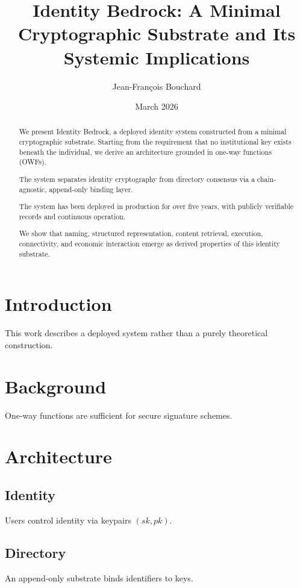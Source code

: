 \documentclass[11pt,a4paper]{article}
\title{\textbf{Identity Bedrock: A Minimal Cryptographic Substrate and Its Systemic Implications}}
\author{Jean-François Bouchard}
\date{March 2026}
\begin{document}
\maketitle

\begin{abstract}
We present Identity Bedrock, a deployed identity system constructed from a minimal cryptographic substrate. Starting from the requirement that no institutional key exists beneath the individual, we derive an architecture grounded in one-way functions (OWFs).

The system separates identity cryptography from directory consensus via a chain-agnostic, append-only binding layer.

The system has been deployed in production for over five years, with publicly verifiable records and continuous operation.

We show that naming, structured representation, content retrieval, execution, connectivity, and economic interaction emerge as derived properties of this identity substrate.
\end{abstract}

\section{Introduction}

This work describes a deployed system rather than a purely theoretical construction.

\section{Background}

One-way functions are sufficient for secure signature schemes.

\section{Architecture}

\subsection{Identity}

Users control identity via keypairs $(sk, pk)$.

\subsection{Directory}

An append-only substrate binds identifiers to keys.
\end{document}

